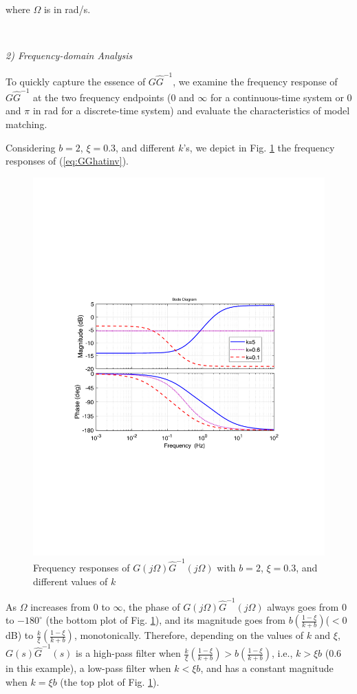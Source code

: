 \documentclass [11pt, proquest] {uwthesis}[2020/02/24]
\begin{document}
\noindent where $\Omega$ is in rad/s.

\

\noindent \emph{2) Frequency-domain Analysis}

To quickly capture the essence of $G\hat{G}^{-1}$, we examine the
frequency response of $G\hat{G}^{-1}$ at the two frequency endpoints
(0 and $\infty$ for a continuous-time system or 0 and $\pi$ in rad
for a discrete-time system) and evaluate the characteristics of model
matching.

Considering $b=2$, $\xi=0.3$, and different $k$'s, we depict in
Fig. \ref{fig:Nominal-model-inversion-2} the frequency responses
of (\ref{eq:GGhatinv}). 
\begin{figure}[!ht]
\begin{centering}
\includegraphics[width=12cm]{Model-inversion/Hinf}
\par\end{centering}
\caption{\label{fig:Nominal-model-inversion-2}Frequency responses of $G(j\Omega)\hat{G}^{-1}(j\Omega)$
with $b=2$, $\xi=0.3$, and different values of $k$}
\end{figure}
As $\Omega$ increases from 0 to $\infty$, the phase of $G(j\Omega)\hat{G}^{-1}(j\Omega)$
always goes from $0$ to $-180^{\circ}$ (the bottom plot of Fig.
\ref{fig:Nominal-model-inversion-2}), and its magnitude goes from
$b\left(\frac{1-\xi}{k+b}\right)$($<$0 dB) to $\frac{k}{\xi}\left(\frac{1-\xi}{k+b}\right)$,
monotonically. Therefore, depending on the values of $k$ and $\xi$,
$G(s)\hat{G}^{-1}(s)$ is a high-pass filter when $\frac{k}{\xi}\left(\frac{1-\xi}{k+b}\right)>b\left(\frac{1-\xi}{k+b}\right)$,
i.e., $k>\xi b$ (0.6 in this example), a low-pass filter when $k<\xi b$,
and has a constant magnitude when $k=\xi b$ (the top plot of Fig.
\ref{fig:Nominal-model-inversion-2}).
\end{document}
